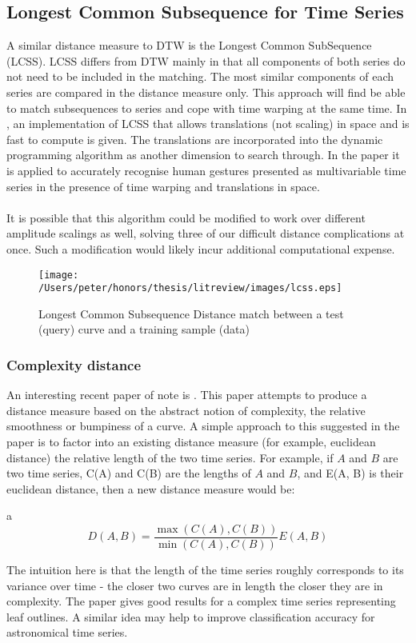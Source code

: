	\subsection{Longest Common Subsequence for Time Series}
	A similar distance measure to DTW is the Longest Common SubSequence (LCSS). LCSS differs from DTW mainly in that all components of both series do not need to be included in the matching. The most similar components of each series are compared in the distance measure only. This approach will find be able to match subsequences to series and cope with time warping at the same time. In \citep{vlachos2002discovering}, an implementation of LCSS that allows translations (not scaling) in space and is fast to compute is given. The translations are incorporated into the dynamic programming algorithm as another dimension to search through.  In the paper it is applied to accurately recognise human gestures presented as multivariable time series in the presence of time warping and translations in space.
	\paragraph{}
	It is possible that this algorithm could be modified to work over different amplitude scalings as well, solving three of our difficult distance complications at once. Such a modification would likely incur additional computational expense. 
	
	\begin{figure}[h!]
	\centering
	\texttt{[image: /Users/peter/honors/thesis/litreview/images/lcss.eps]}
	\label{fig:lcss}
	\caption{Longest Common Subsequence Distance match between a test (query) curve and a training sample (data)}
	\end{figure}
	
	\subsubsection{Complexity distance} 
	An interesting recent paper of note is \citep{batista2011complexity}. This paper attempts to produce a distance measure based on the abstract notion of complexity, the relative smoothness or bumpiness of a curve. A simple approach to this suggested in the paper is to factor into an existing distance measure (for example, euclidean distance) the relative length of the two time series. For example, if $A$ and $B$ are two time series, C(A) and C(B) are the lengths of $A$ and $B$, and E(A, B) is their euclidean distance, then a new distance measure would be:
	\begin{center}a
	\begin{equation*}
		D(A,B) = \frac{\max(C(A), C(B))}{\min(C(A), C(B))}E(A,B)
	\end{equation*}
	\end{center}
	 The intuition here is that the length of the time series roughly corresponds to its variance over time - the closer two curves are in length the closer they are in complexity. The paper gives good results for a complex time series representing leaf outlines. A similar idea may help to improve classification accuracy for astronomical time series.
	
